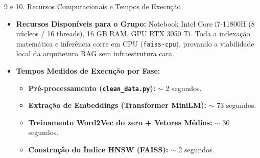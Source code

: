 \documentclass[10pt, aspectratio=169]{beamer}
\begin{document}
\begin{frame}{9 e 10. Recursos Computacionais e Tempos de Execução}
    \begin{itemize}
        \item \textbf{Recursos Disponíveis para o Grupo:} Notebook Intel Core i7-11800H (8 núcleos / 16 threads), 16 GB RAM, GPU RTX 3050 Ti. Toda a indexação matemática e inferência corre em CPU (\texttt{faiss-cpu}), provando a viabilidade local da arquitetura RAG sem infraestrutura cara.
        \item \textbf{Tempos Medidos de Execução por Fase:}
        \begin{itemize}
            \item \textbf{Pré-processamento (\texttt{clean\_data.py}):} $\sim$ 2 segundos.
            \item \textbf{Extração de Embeddings (Transformer MiniLM):} $\sim$ 73 segundos.
            \item \textbf{Treinamento Word2Vec do zero + Vetores Médios:} $\sim$ 30 segundos.
            \item \textbf{Construção do Índice HNSW (FAISS):} $\sim$ 2 segundos.
        \end{itemize}
    \end{itemize}
\end{frame}
\end{document}
